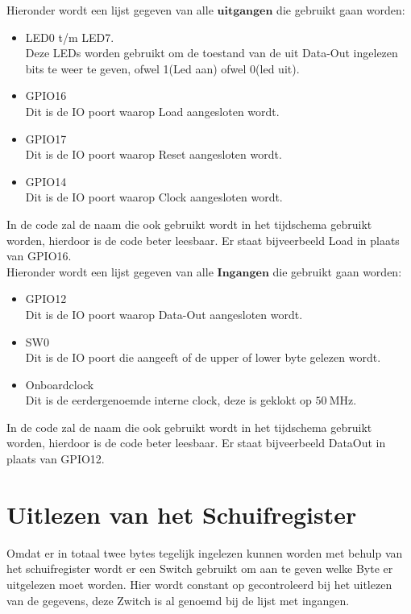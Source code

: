 Hieronder wordt een lijst gegeven van alle $\boldsymbol{uitgangen}$ die gebruikt gaan worden:
\begin{itemize}
	\item LED0 t/m  LED7.\\
	Deze LEDs worden gebruikt om de toestand van de uit Data-Out ingelezen bits te weer te geven, ofwel 1(Led aan) ofwel 0(led uit).
	\item GPIO16\\
	Dit is de IO poort waarop Load aangesloten wordt.
	\item GPIO17\\
	Dit is de IO poort waarop Reset aangesloten wordt.
	\item GPIO14\\
	Dit is de IO poort waarop Clock aangesloten wordt.

\end{itemize}
In de code zal de naam die ook gebruikt wordt in het tijdschema gebruikt worden, hierdoor is de code beter leesbaar. Er staat bijveerbeeld Load in plaats van GPIO16. \\
\clearpage
Hieronder wordt een lijst gegeven van alle $\boldsymbol{Ingangen}$ die gebruikt gaan worden:
\begin{itemize}
		\item GPIO12\\
		Dit is de IO poort waarop Data-Out aangesloten wordt.
		\item SW0\\
		Dit is de IO poort die aangeeft of de upper of lower byte gelezen wordt.
		\item Onboardclock\\
		Dit is de eerdergenoemde interne clock, deze is geklokt op $\SI{50}{\mega\hertz} $. 
\end{itemize}
In de code zal de naam die ook gebruikt wordt in het tijdschema gebruikt worden, hierdoor is de code beter leesbaar. Er staat bijveerbeeld DataOut in plaats van GPIO12. \\

\section{Uitlezen van het Schuifregister}
Omdat er in totaal twee bytes tegelijk ingelezen kunnen worden met behulp van het schuifregister wordt er een Switch gebruikt om aan te geven welke Byte er uitgelezen moet worden. Hier wordt constant op gecontroleerd bij het uitlezen van de gegevens, deze Zwitch is al genoemd bij de lijst met ingangen.\\\\

